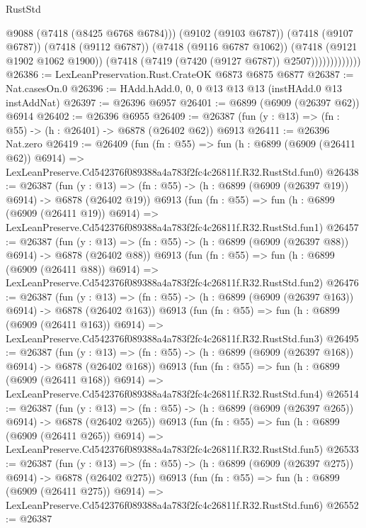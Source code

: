 \begin{lexlean}{RustStd}
\begin{coremodule}
                            @9088
                            (@7418 (@8425 @6768 @6784)))
                          (@9102 (@9103 @6787))
                          (@7418 (@9107 @6787))
                          (@7418 (@9112 @6787))
                          (@7418 (@9116 @6787 @1062))
                          (@7418 (@9121 @1902 @1062 @1900))
                          (@7418 (@7419 (@7420 (@9127 @6787)) @2507)))))))))))))
@26386 := LexLeanPreservation.Rust.CrateOK @6873 @6875 @6877
@26387 := Nat.casesOn.{0}
@26396 := HAdd.hAdd.{0, 0, 0} @13 @13 @13 (instHAdd.{0} @13 instAddNat)
@26397 := @26396 @6957
@26401 := @6899 (@6909 (@26397 @62)) @6914
@26402 := @26396 @6955
@26409 := @26387 (fun (y : @13) => (fn : @55) -> (h : @26401) -> @6878 (@26402 @62)) @6913
@26411 := @26396 Nat.zero
@26419 := @26409
    (fun (fn : @55) =>
    fun (h : @6899 (@6909 (@26411 @62)) @6914) =>
    LexLeanPreserve.Cd542376f089388a4a783f2fc4c26811f.R32.RustStd.fun0)
@26438 := @26387
    (fun (y : @13) => (fn : @55) -> (h : @6899 (@6909 (@26397 @19)) @6914) -> @6878 (@26402 @19))
    @6913
    (fun (fn : @55) =>
    fun (h : @6899 (@6909 (@26411 @19)) @6914) =>
    LexLeanPreserve.Cd542376f089388a4a783f2fc4c26811f.R32.RustStd.fun1)
@26457 := @26387
    (fun (y : @13) => (fn : @55) -> (h : @6899 (@6909 (@26397 @88)) @6914) -> @6878 (@26402 @88))
    @6913
    (fun (fn : @55) =>
    fun (h : @6899 (@6909 (@26411 @88)) @6914) =>
    LexLeanPreserve.Cd542376f089388a4a783f2fc4c26811f.R32.RustStd.fun2)
@26476 := @26387
    (fun (y : @13) => (fn : @55) -> (h : @6899 (@6909 (@26397 @163)) @6914) -> @6878 (@26402 @163))
    @6913
    (fun (fn : @55) =>
    fun (h : @6899 (@6909 (@26411 @163)) @6914) =>
    LexLeanPreserve.Cd542376f089388a4a783f2fc4c26811f.R32.RustStd.fun3)
@26495 := @26387
    (fun (y : @13) => (fn : @55) -> (h : @6899 (@6909 (@26397 @168)) @6914) -> @6878 (@26402 @168))
    @6913
    (fun (fn : @55) =>
    fun (h : @6899 (@6909 (@26411 @168)) @6914) =>
    LexLeanPreserve.Cd542376f089388a4a783f2fc4c26811f.R32.RustStd.fun4)
@26514 := @26387
    (fun (y : @13) => (fn : @55) -> (h : @6899 (@6909 (@26397 @265)) @6914) -> @6878 (@26402 @265))
    @6913
    (fun (fn : @55) =>
    fun (h : @6899 (@6909 (@26411 @265)) @6914) =>
    LexLeanPreserve.Cd542376f089388a4a783f2fc4c26811f.R32.RustStd.fun5)
@26533 := @26387
    (fun (y : @13) => (fn : @55) -> (h : @6899 (@6909 (@26397 @275)) @6914) -> @6878 (@26402 @275))
    @6913
    (fun (fn : @55) =>
    fun (h : @6899 (@6909 (@26411 @275)) @6914) =>
    LexLeanPreserve.Cd542376f089388a4a783f2fc4c26811f.R32.RustStd.fun6)
@26552 := @26387

\end{coremodule}
\end{lexlean}
